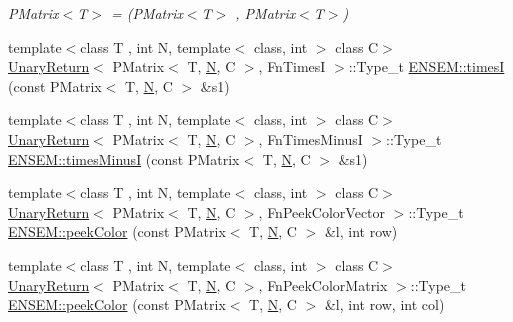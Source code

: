 \begin{DoxyCompactItemize}
\begin{DoxyCompactList}\small\item\em P\+Matrix$<$\+T$>$ = (P\+Matrix$<$\+T$>$ , P\+Matrix$<$\+T$>$) \end{DoxyCompactList}\item 
{\footnotesize template$<$class T , int N, template$<$ class, int $>$ class C$>$ }\\\mbox{\hyperlink{structUnaryReturn}{Unary\+Return}}$<$ P\+Matrix$<$ T, \mbox{\hyperlink{adat__devel_2lib_2hadron_2operator__name__util_8cc_a7722c8ecbb62d99aee7ce68b1752f337}{N}}, C $>$, Fn\+TimesI $>$\+::Type\+\_\+t \mbox{\hyperlink{group__primmatrix_ga9f1d3892badcfa2bf78d97c42c8a05e5}{E\+N\+S\+E\+M\+::timesI}} (const P\+Matrix$<$ T, \mbox{\hyperlink{adat__devel_2lib_2hadron_2operator__name__util_8cc_a7722c8ecbb62d99aee7ce68b1752f337}{N}}, C $>$ \&s1)
\item 
{\footnotesize template$<$class T , int N, template$<$ class, int $>$ class C$>$ }\\\mbox{\hyperlink{structUnaryReturn}{Unary\+Return}}$<$ P\+Matrix$<$ T, \mbox{\hyperlink{adat__devel_2lib_2hadron_2operator__name__util_8cc_a7722c8ecbb62d99aee7ce68b1752f337}{N}}, C $>$, Fn\+Times\+MinusI $>$\+::Type\+\_\+t \mbox{\hyperlink{group__primmatrix_ga937a4152dd7d0ceaec303ddbdbaf5a98}{E\+N\+S\+E\+M\+::times\+MinusI}} (const P\+Matrix$<$ T, \mbox{\hyperlink{adat__devel_2lib_2hadron_2operator__name__util_8cc_a7722c8ecbb62d99aee7ce68b1752f337}{N}}, C $>$ \&s1)
\item 
{\footnotesize template$<$class T , int N, template$<$ class, int $>$ class C$>$ }\\\mbox{\hyperlink{structUnaryReturn}{Unary\+Return}}$<$ P\+Matrix$<$ T, \mbox{\hyperlink{adat__devel_2lib_2hadron_2operator__name__util_8cc_a7722c8ecbb62d99aee7ce68b1752f337}{N}}, C $>$, Fn\+Peek\+Color\+Vector $>$\+::Type\+\_\+t \mbox{\hyperlink{group__primmatrix_ga95fe2504ecc461173cb780afe6dbbbf4}{E\+N\+S\+E\+M\+::peek\+Color}} (const P\+Matrix$<$ T, \mbox{\hyperlink{adat__devel_2lib_2hadron_2operator__name__util_8cc_a7722c8ecbb62d99aee7ce68b1752f337}{N}}, C $>$ \&l, int row)
\item 
{\footnotesize template$<$class T , int N, template$<$ class, int $>$ class C$>$ }\\\mbox{\hyperlink{structUnaryReturn}{Unary\+Return}}$<$ P\+Matrix$<$ T, \mbox{\hyperlink{adat__devel_2lib_2hadron_2operator__name__util_8cc_a7722c8ecbb62d99aee7ce68b1752f337}{N}}, C $>$, Fn\+Peek\+Color\+Matrix $>$\+::Type\+\_\+t \mbox{\hyperlink{group__primmatrix_gaa9e8d0698d08d9e4b6924a14192c17b4}{E\+N\+S\+E\+M\+::peek\+Color}} (const P\+Matrix$<$ T, \mbox{\hyperlink{adat__devel_2lib_2hadron_2operator__name__util_8cc_a7722c8ecbb62d99aee7ce68b1752f337}{N}}, C $>$ \&l, int row, int col)

\end{DoxyCompactItemize}
